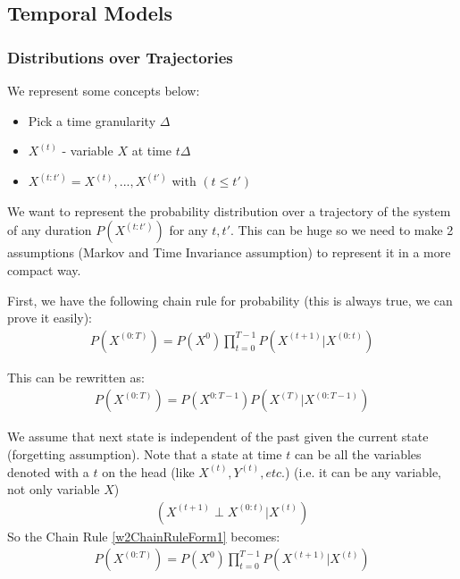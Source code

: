 \subsection{Temporal Models}
\subsubsection{Distributions over Trajectories}
We represent some concepts below:
\begin{itemize}
	\item Pick a time granularity $\Delta$
	\item $X^{(t)}$ - variable $X$ at time $t\Delta$
	\item $X^{(t:t')} = {X^{(t)}, ..., X^{(t')}}$  with $(t \leq t')$
\end{itemize}
We want to represent the probability distribution over a trajectory of the system of any duration $P(X^{(t:t')})$ for any $t, t'$. This can be huge so we need to make 2 assumptions (Markov and Time Invariance assumption) to represent it in a more compact way.

First, we have the following chain rule for probability (this is always true, we can prove it easily):
\begin{align}\label{w2ChainRuleForm1}
P(X^{(0:T)}) = P(X^{0}) \prod_{t=0}^{T-1}P(X^{(t+1)} | X^{(0:t)} )
\end{align}

This can be rewritten as:
\begin{align}
P(X^{(0:T)}) = P(X^{0:T-1}) P(X^{(T)} | X^{(0:T-1)} )
\end{align}

\begin{defi}
We assume that next state is independent of the past given the current state (forgetting assumption). Note that a state at time $t$ can be all the variables denoted with a $t$ on the head (like $X^{(t)}, Y^{(t)}, etc.$) (i.e. it can be any variable, not only variable $X$)
\begin{align}
(X^{(t+1)} \perp X^{(0:t)} | X^{(t)})
\end{align}
So the Chain Rule \ref{w2ChainRuleForm1} becomes:
\begin{align}
P(X^{(0:T)}) = P(X^{0}) \prod_{t=0}^{T-1}P(X^{(t+1)} | X^{(t)} )
\end{align}
\end{defi}

